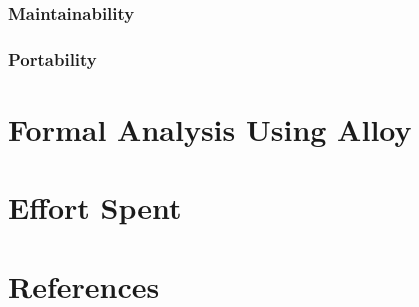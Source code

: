 \documentclass[11pt]{article}
\begin{document}
\subsubsection{Maintainability}

\subsubsection{Portability}

\section{Formal Analysis Using Alloy}

\section{Effort Spent}

\section{References}
\end{document}
